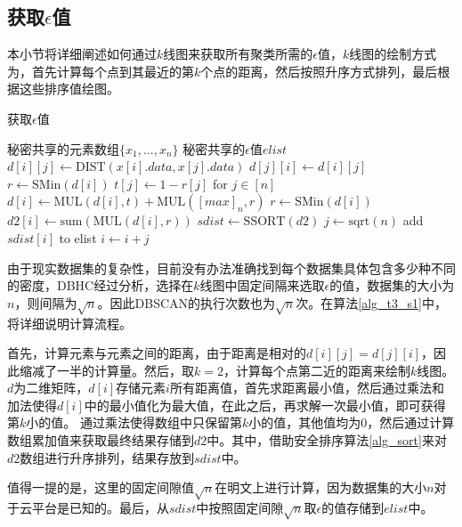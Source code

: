 \subsection{获取$\epsilon$值}
本小节将详细阐述如何通过$ k $线图来获取所有聚类所需的$\epsilon$值，$ k $线图的绘制方式为，首先计算每个点到其最近的第$ k $个点的距离，然后按照升序方式排列，最后根据这些排序值绘图。

\begin{algorithm}[htbp]
	\renewcommand{\algorithmicrequire}{\textbf{输入:}}
	\renewcommand{\algorithmicensure}{\textbf{输出:}}
	\caption{获取$\epsilon$值}
	\label{alg_t3_s1}
	\begin{algorithmic}[1]
		\REQUIRE 秘密共享的元素数组$ \{x_1,...,x_n\} $
		\ENSURE 秘密共享的$\epsilon$值$ elist $
		\STATE $ d[i][j] \leftarrow \text{DIST}(x[i].data, x[j].data) $
		\STATE $ d[j][i] \leftarrow d[i][j] $
		\ENDFOR
		\ENDFOR
		\STATE $ r \leftarrow \text{SMin}(d[i]) $ %
		\STATE $ t[j] \leftarrow 1-r[j] $ for $ j\in[n] $
		\STATE $ d[i] \leftarrow \text{MUL}(d[i], t) + \text{MUL}([max]_n, r) $
		\STATE $ r \leftarrow \text{SMin}(d[i]) $
		\STATE $ d2[i] \leftarrow \text{sum}(\text{MUL}(d[i], r)) $ %
		\ENDFOR
		\STATE $ sdist \leftarrow \text{SSORT}(d2) $
		\STATE $ j \leftarrow \text{sqrt}(n) $
		\STATE add $ sdist[i] $ to elist
		\STATE $ i \leftarrow i + j $
		\ENDFOR
	\end{algorithmic}
\end{algorithm}

由于现实数据集的复杂性，目前没有办法准确找到每个数据集具体包含多少种不同的密度，DBHC\cite{latifi2021dbhc}经过分析，选择在$ k $线图中固定间隔来选取$\epsilon$的值，数据集的大小为$ n $，则间隔为$ \sqrt{n} $。因此DBSCAN的执行次数也为$ \sqrt{n} $次。在算法\ref{alg_t3_s1}中，将详细说明计算流程。

首先，计算元素与元素之间的距离，由于距离是相对的$ d[i][j]=d[j][i] $，因此缩减了一半的计算量。然后，取$ k=2 $，计算每个点第二近的距离来绘制$ k $线图。$ d $为二维矩阵，$ d[i] $存储元素$ i $所有距离值，首先求距离最小值，然后通过乘法和加法使得$ d[i] $中的最小值化为最大值，在此之后，再求解一次最小值，即可获得第$ k $小的值。
通过乘法使得数组中只保留第$ k $小的值，其他值均为0，然后通过计算数组累加值来获取最终结果存储到$ d2 $中。其中，借助安全排序算法\ref{alg_sort}来对$ d2 $数组进行升序排列，结果存放到$ sdist $中。

值得一提的是，这里的固定间隙值$ \sqrt{n} $在明文上进行计算，因为数据集的大小$ n $对于云平台是已知的。最后，从$ sdist $中按照固定间隙$ \sqrt{n} $取$\epsilon$的值存储到$ elist $中。


